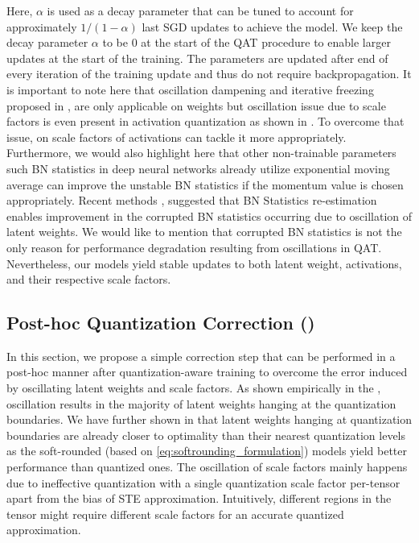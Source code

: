 Here, $\alpha$ is used as a decay parameter that can be tuned to account for approximately $1/(1-\alpha)$ last \acrshort{SGD} updates to achieve the \exma{} model. We keep the decay parameter $\alpha$ to be $0$ at the start of the \acrshort{QAT} procedure to enable larger updates at the start of the training. The \exma{} parameters are updated after end of every iteration of the training update and thus do not require backpropagation. It is important to note here that oscillation dampening and iterative freezing proposed in \cite{nagel2022overcoming}, are only applicable on weights but oscillation issue due to scale factors is even present in activation quantization as shown in . To overcome that issue, \exma{} on scale factors of activations can tackle it more appropriately. Furthermore, we would also highlight here that other non-trainable parameters such \gls{BN} statistics in deep neural networks already utilize exponential moving average can improve the unstable \acrshort{BN} statistics if the momentum value is chosen appropriately. Recent methods \cite{nagel2022overcoming}, suggested that \acrshort{BN} Statistics re-estimation enables improvement in the corrupted \acrshort{BN} statistics occurring due to oscillation of latent weights. We would like to mention that corrupted \acrshort{BN} statistics is not the only reason for performance degradation resulting from oscillations in \acrshort{QAT}. Nevertheless, our \exma{} models yield stable updates to both latent weight, activations, and their respective scale factors.

\subsection{Post-hoc Quantization Correction (\qc)}
\label{sec:qat-correction}

In this section, we propose a simple correction step that can be performed in a post-hoc manner after quantization-aware training to overcome the error induced by oscillating latent weights and scale factors. As shown empirically in the , oscillation results in the majority of latent weights hanging at the quantization boundaries. We have further shown in  that latent weights hanging at quantization boundaries are already closer to optimality than their nearest quantization levels as the soft-rounded (based on \eqref{eq:softrounding_formulation}) \yolo{} models yield better performance than quantized ones. The oscillation of scale factors mainly happens due to ineffective quantization with a single quantization scale factor per-tensor apart from the bias of STE approximation. Intuitively, different regions in the tensor might require different scale factors for an accurate quantized approximation. 

